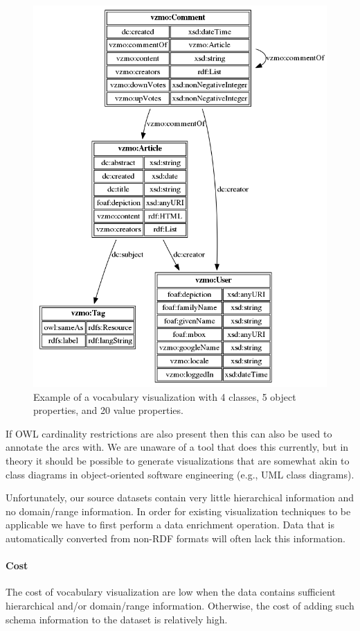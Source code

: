 \documentclass[a4paper]{scrartcl}
\begin{document}
\begin{figure}
  \centering
  \includegraphics[width=0.75\linewidth]{img/vocab_viz}
  \caption{Example of a vocabulary visualization with 4 classes, 5
    object properties, and 20 value properties.}
  \label{fig:vocab_viz}
\end{figure}

If OWL cardinality restrictions are also present then this can also be
used to annotate the arcs with.  We are unaware of a tool that does
this currently, but in theory it should be possible to generate
visualizations that are somewhat akin to class diagrams in
object-oriented software engineering (e.g., UML class diagrams).

Unfortunately, our source datasets contain very little hierarchical
information and no domain/range information.  In order for existing
visualization techniques to be applicable we have to first perform a
data enrichment operation.  Data that is automatically converted from
non-RDF formats will often lack this information.

\paragraph{Cost}
The cost of vocabulary visualization are low when the data contains
sufficient hierarchical and/or domain/range information.  Otherwise,
the cost of adding such schema information to the dataset is
relatively high.
\end{document}
